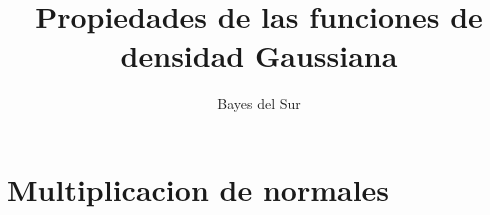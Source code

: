 \documentclass[a4paper,10pt]{article}
\title{Propiedades de las funciones de densidad Gaussiana}
\author{Bayes del Sur}
\begin{document}
\maketitle

\section{Multiplicacion de normales}\label{multiplicacion_normales}

\end{document}
